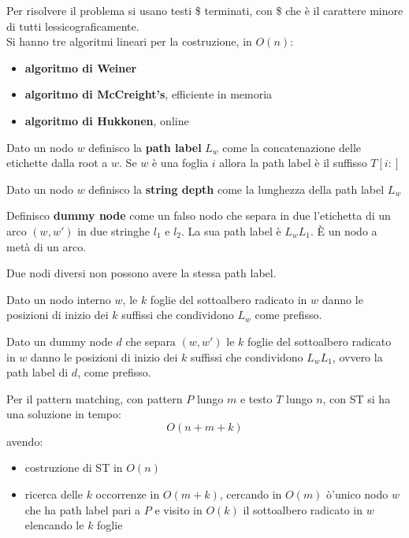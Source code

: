 \documentclass[a4paper,12pt, oneside]{book}
\begin{document}
Per risolvere il problema si usano testi \$ terminati, con \$ che è il carattere
minore di tutti lessicograficamente.\\
Si hanno tre algoritmi lineari per la costruzione, in $O(n)$:
\begin{itemize}
  \item \textbf{algoritmo di Weiner}
  \item \textbf{algoritmo di McCreight's}, efficiente in memoria
  \item \textbf{algoritmo di Hukkonen}, online
\end{itemize}
\begin{definizione}
  Dato un nodo $w$ definisco la \textbf{path label} $L_w$ come la concatenazione
  delle etichette dalla root a $w$. Se $w$ è una foglia $i$ allora la path label
  è il suffisso $T[i:]$
\end{definizione}
\begin{definizione}
  Dato un nodo $w$ definisco la \textbf{string depth} come la lunghezza della
  path label $L_w$
\end{definizione}
\begin{definizione}
  Definisco \textbf{dummy node} come un falso nodo che separa in due l'etichetta
  di un arco $(w,w')$ in due stringhe $l_1$ e $l_2$. La sua path label è
  $L_wL_1$. È un nodo a metà di un arco.
\end{definizione}
\begin{teorema}
  Due nodi diversi non possono avere la stessa path label.
\end{teorema}
\begin{teorema}
  Dato un nodo interno $w$, le $k$ foglie del sottoalbero radicato in $w$ danno
  le posizioni di inizio dei $k$ suffissi che condividono $L_w$ come prefisso.
\end{teorema}
\begin{teorema}
  Dato un dummy node $d$ che separa $(w,w')$  le $k$ foglie del sottoalbero
  radicato in $w$ danno 
  le posizioni di inizio dei $k$ suffissi che condividono $L_wL_1$, ovvero la
  path label di $d$, come prefisso. 
\end{teorema}
Per il pattern matching, con pattern $P$ lungo $m$ e testo $T$ lungo $n$, con ST
si ha una soluzione in tempo: 
\[O(n+m+k)\]
avendo:
\begin{itemize}
  \item costruzione di ST in $O(n)$
  \item ricerca delle $k$ occorrenze in $O(m+k)$, cercando in $O(m)$ ò'unico
  nodo $w$ che ha path label pari a $P$ e visito in $O(k)$ il sottoalbero
  radicato in $w$ elencando le $k$ foglie
\end{itemize}
\end{document}
